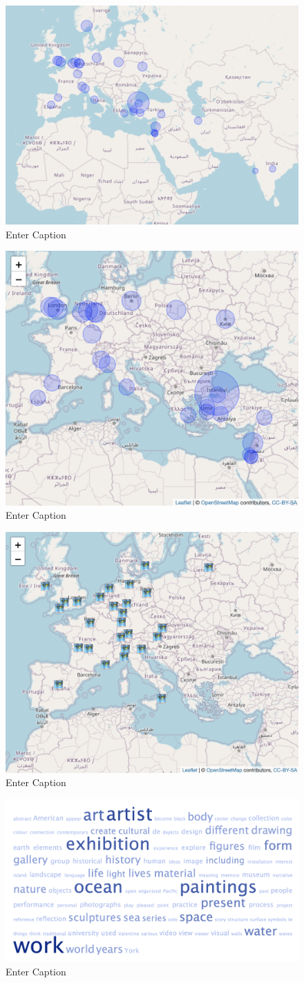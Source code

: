 \documentclass[a4paper, twoside, 12pt]{book}
\begin{document}
\begin{figure}
    \centering
    \includegraphics[width=0.5\linewidth]{Screenshot 2023-06-15 at 00.40.29.png}
    \caption{Enter Caption}
    \label{fig:enter-label}
\end{figure}
\begin{figure}
    \centering
    \includegraphics[width=0.5\linewidth]{istanbul whole world scaled.png}
    \caption{Enter Caption}
    \label{fig:enter-label}
\end{figure}
\begin{figure}
    \centering
    \includegraphics[width=0.5\linewidth]{fend .png}
    \caption{Enter Caption}
    \label{fig:enter-label}
\end{figure}
\begin{figure}
    \centering
    \includegraphics[width=1\linewidth]{Screenshot 2023-06-14 at 19.00.35.png}
    \caption{Enter Caption}
    \label{fig:enter-label}
\end{figure}
\end{document}
